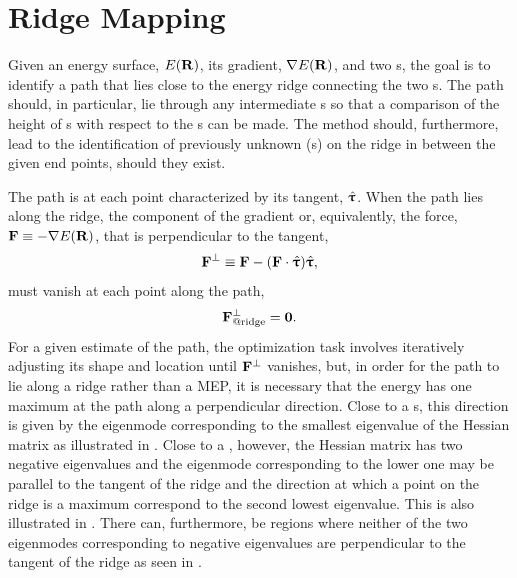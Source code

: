 \section{Ridge Mapping}
\label{sec:ridge-mapping}
Given an energy surface, $E({\mathrm{\mathbf{\bm{R}}}})$, its gradient, $\nabla E({\mathrm{\mathbf{\bm{R}}}})$, and two s, the goal is to identify a path that lies close to the energy ridge connecting the two s.
The path should, in particular, lie through any intermediate s so that a comparison of the height of s with respect to the s can be made.
The method should, furthermore, lead to the identification of previously unknown (s) on the ridge in between the given end points, should they exist.

The path is at each point characterized by its tangent, $\hat{{\mathrm{\mathbf{\bm{\uptau}}}}}$.
When the path lies along the ridge, the component of the gradient or, equivalently, the force, ${\mathrm{\mathbf{\bm{F}}}} \equiv -\nabla E({\mathrm{\mathbf{\bm{R}}}})$, that is perpendicular to the tangent,
\begin{equation}
   {\ensuremath{\mathrm{\mathbf{\bm{F}}}}}^\perp \equiv {\ensuremath{\mathrm{\mathbf{\bm{F}}}}} - ({\mathrm{\mathbf{\bm{F}}}} \cdot \hat{{\mathrm{\mathbf{\bm{\uptau}}}}})\hat{{\mathrm{\mathbf{\bm{\uptau}}}}},
\label{eq:perpendicular-force}
\end{equation}
must vanish at each point along the path,
\begin{equation}
   {\ensuremath{\mathrm{\mathbf{\bm{F}}}}}^\perp_\text{@ridge} = \textbf{0}.
\label{eq:ridge-force-criterion}
\end{equation}
For a given estimate of the path, the optimization task involves iteratively adjusting its shape and location until ${\mathrm{\mathbf{\bm{F}}}}^\perp$ vanishes,
but, in order for the path to lie along a ridge rather than a MEP, it is necessary that the energy has one maximum at the path along a perpendicular direction.
Close to a s, this direction is given by the eigenmode corresponding to the smallest eigenvalue of the Hessian matrix as illustrated in .
Close to a , however, the Hessian matrix has two negative eigenvalues and the eigenmode corresponding to the lower one may be parallel to the tangent of the ridge and the direction at which a point on the ridge is a maximum correspond to the second lowest eigenvalue.
This is also illustrated in .
There can, furthermore, be regions where neither of the two eigenmodes corresponding to negative eigenvalues are perpendicular to the tangent of the ridge as seen in .



